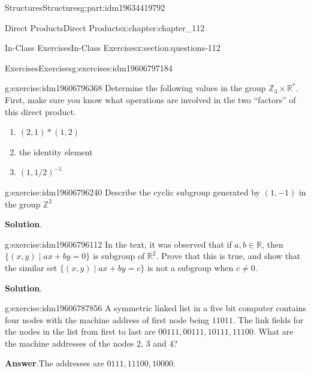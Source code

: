 \documentclass[oneside,10pt,]{book}
\newcommand{\blocktitlefont}{\relax}
\numberwithin{equation}{section}
\begin{document}
\begin{partptx}{Structures}{}{Structures}{}{}{g:part:idm19634419792}
\begin{chapterptx}{Direct Products}{}{Direct Products}{}{}{x:chapter:chapter_112}
\begin{sectionptx}{In-Class Exercises}{}{In-Class Exercises}{}{}{x:section:questions-112}
%
%
%
\typeout{************************************************}
\typeout{************************************************}
%
\begin{exercises-subsection-numberless}{Exercises}{}{Exercises}{}{}{g:exercises:idm19606797184}
\par\medskip\noindent%
%
\begin{exercisegroup}
\begin{divisionexerciseeg}{1}{}{}{g:exercise:idm19606796368}%
Determine the following values in the group \(\mathbb{Z}_3 \times  \mathbb{R}^*\).  First, make sure you know what operations are involved in the two ``factors'' of this direct product.%
\begin{enumerate}[label=(\alph*)]
\item{}\(\displaystyle (2,1)* (1,2)\)%
\item{}the identity element%
\item{}\(\displaystyle (1, 1/2)^{-1}\)%
\end{enumerate}
%
\end{divisionexerciseeg}%
\begin{divisionexerciseeg}{2}{}{}{g:exercise:idm19606796240}%
Describe the cyclic subgroup generated by \((1,-1)\) in the group \(\mathbb{Z}^2\)%
\par\smallskip%
\noindent\textbf{\blocktitlefont Solution}.\hypertarget{g:solution:idm19606791056}{}\quad{}%
\end{divisionexerciseeg}%
\begin{divisionexerciseeg}{3}{}{}{g:exercise:idm19606796112}%
In the text, it was observed that if \(a, b \in  \mathbb{R}\),  then \(\{(x, y) \mid a x + b y = 0\}\) is subgroup of \(\mathbb{R}^2\).  Prove that this is true, and show that the similar set  \(\{(x, y) \mid a x + b y = c\}\) is not a subgroup when \(c \neq 0\).%
\par\smallskip%
\noindent\textbf{\blocktitlefont Solution}.\hypertarget{g:solution:idm19606790304}{}\quad{}%
\end{divisionexerciseeg}%
\begin{divisionexerciseeg}{4}{}{}{g:exercise:idm19606787856}%
A symmetric linked list in a five bit computer contains four nodes with the machine address of first node being \(11011\).  The link fields for the nodes in the list from first to last are \(00111, 00111, 10111, 11100\).  What are the machine addresses of the nodes 2, 3 and 4?%
\par\smallskip%
\noindent\textbf{\blocktitlefont Answer}.\hypertarget{g:answer:idm19606786256}{}\quad{}The addresses are \(0111, 11100, 10000\).%

\end{divisionexerciseeg}
\end{exercisegroup}
\end{exercises-subsection-numberless}
\end{sectionptx}
\end{chapterptx}
\end{partptx}
\end{document}
